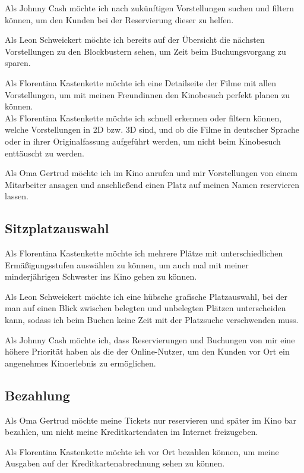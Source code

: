 Als Johnny Cash möchte ich nach zukünftigen Vorstellungen suchen und filtern können, um den Kunden bei der Reservierung dieser zu helfen.

Als Leon Schweickert möchte ich bereits auf der Übersicht die nächsten Vorstellungen zu den Blockbustern sehen, um Zeit beim Buchungsvorgang zu sparen.

Als Florentina Kastenkette möchte ich eine Detailseite der Filme mit allen Vorstellungen, um mit meinen Freundinnen den Kinobesuch perfekt planen zu können.
\\
Als Florentina Kastenkette möchte ich schnell erkennen oder filtern können, welche Vorstellungen in 2D bzw. 3D sind, und ob die Filme in deutscher Sprache oder in ihrer Originalfassung aufgeführt werden, um nicht beim Kinobesuch enttäuscht zu werden.

Als Oma Gertrud möchte ich im Kino anrufen und mir Vorstellungen von einem Mitarbeiter ansagen und anschließend einen Platz auf meinen Namen reservieren lassen.

\subsection{Sitzplatzauswahl}
Als Florentina Kastenkette möchte ich mehrere Plätze mit unterschiedlichen Ermäßigungsstufen auswählen zu können, um auch mal mit meiner minderjährigen Schwester ins Kino gehen zu können.

Als Leon Schweickert möchte ich eine hübsche grafische Platzauswahl, bei der man auf einen Blick zwischen belegten und unbelegten Plätzen unterscheiden kann, sodass ich beim Buchen keine Zeit mit der Platzsuche verschwenden muss.

Als Johnny Cash möchte ich, dass Reservierungen und Buchungen von mir eine höhere Priorität haben als die der Online-Nutzer, um den Kunden vor Ort ein angenehmes Kinoerlebnis zu ermöglichen.

\subsection{Bezahlung}
Als Oma Gertrud möchte meine Tickets nur reservieren und später im Kino bar bezahlen, um nicht meine Kreditkartendaten im Internet freizugeben.

Als Florentina Kastenkette möchte ich vor Ort bezahlen können, um meine Ausgaben auf der Kreditkartenabrechnung sehen zu können.


